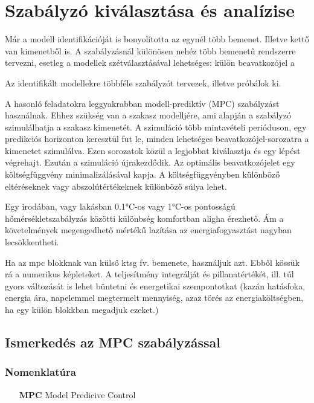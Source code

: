 \chapter{Szabályzó kiválasztása és analízise}

Már a modell identifikációját is bonyolította az egynél több bemenet. Illetve kettő van kimenetből is. A szabályzásnál különösen nehéz több bemenetű rendszerre tervezni, esetleg a modellek szétválasztásával lehetséges: külön beavatkozójel a 


Az identifikált modellekre többféle szabályzót tervezek, illetve próbálok ki.

A hasonló feladatokra leggyakrabban modell-prediktív (MPC) szabályzást használnak. Ehhez szükség van a szakasz modelljére, ami alapján a szabályzó szimulálhatja a szakasz kimenetét. A szimuláció több mintavételi perióduson, egy predikciós horizonton keresztül fut le, minden lehetséges  beavatkozójel-sorozatra a kimenetet szimulálva. Ezen sorozatok közül a legjobbat kiválasztja és egy lépést végrehajt. Ezután a szimuláció újrakezdődik. Az optimális beavatkozójelet egy költségfüggvény minimalizálásával kapja. A költségfüggvényben különböző eltéréseknek vagy abszolútértékeknek különböző súlya lehet.

Egy irodában, vagy lakásban 0.1\si{\celsius}-os vagy 1\si{\celsius}-os pontosságú hőmérsékletszabályzás közötti különbség komfortban aligha érezhető. Ám a követelmények megengedhető mértékű lazítása az energiafogyasztást nagyban lecsökkentheti.

\begin{formal}
	Ha az mpc blokknak van külső ktsg fv. bemenete, használjuk azt. Ebből kössük rá a numerikus képleteket. A teljesítmény integrálját és pillanatértékét, ill. túl gyors változását is lehet büntetni és energetikai szempontotkat (kazán hatásfoka, energia ára, napelemmel megtermelt mennyiség, azaz törés az energiaköltségben, ha egy külön blokkban megadjuk ezeket.)
\end{formal}

\section{Ismerkedés az MPC szabályzással}

\subsection*{Nomenklatúra}

\begin{itemize}[noitemsep,topsep=-8pt,parsep=0pt,partopsep=0pt,leftmargin=42pt]
	\item[\textbf{MPC}] Model Predicive Control
\end{itemize}

